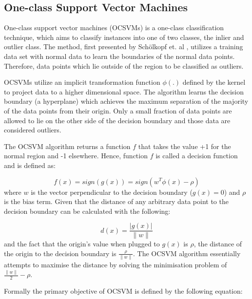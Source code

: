 \documentclass{mpaper}
\begin{document}
\subsection{One-class Support Vector Machines}

One-class support vector machines (OCSVMs) is a one-class classification technique, which aims to classify instances into one of two classes, the inlier and outlier class. The method, first presented by Schölkopf et. al \cite{OriginalOCSVM},  utilizes a training data set with normal data to learn the boundaries of the normal data points. Therefore, data points which lie outside of the region to be classified as outliers. 

OCSVMs utilize an implicit transformation function $\phi\left(.\right)$ defined by the kernel to project data to a higher dimensional space. The algorithm learns the decision boundary (a hyperplane) which achieves the maximum separation of the majority of the data points from their origin. Only a small fraction of data points are allowed to lie on the other side of the decision boundary and those data are considered outliers. 

The OCSVM algorithm returns a function $f$ that takes the value +1 for the normal region and -1 elsewhere. Hence, function $f$ is called a decision function and is defined as:

\begin{equation}
    f(x) = sign(g(x)) = sign(w^T\phi(x) - \rho)
\end{equation}
where $w$ is the vector perpendicular to the decision boundary ($g(x) = 0 $) and $\rho$ is the bias term. 
Given that the distance of any arbitrary data point to the decision boundary can be calculated with the following:

\begin{equation}
    d(x) = \frac{|g(x)|}{\parallel w \parallel}
\end{equation}
and the fact that the origin's value when plugged to $g(x)$ is $\rho$, the distance of the origin to the decision boundary is $\frac{\rho}{\parallel w\parallel}$. The OCSVM algorithm essentially attempts to maximise the distance by solving the minimisation problem of $\frac{\parallel w \parallel}{2} - \rho$.

Formally the primary objective of OCSVM is defined by the following equation:
\end{document}
